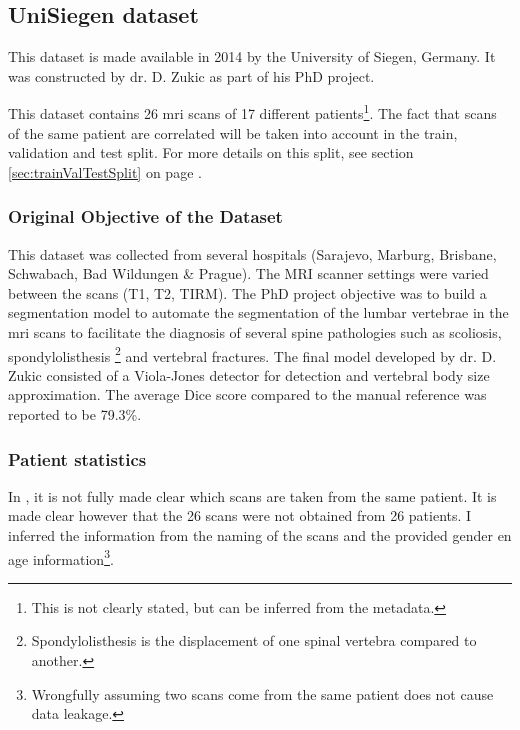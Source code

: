 
\subsection{UniSiegen dataset\label{sec:DataUSiegen}}

This dataset is made available in 2014 by the University of Siegen, Germany.
It was constructed by dr. D. Zukic \cite{Zukic2014} as part of his PhD project.


This dataset contains 26 \acrshort{mri} scans of 17 different patients\footnote{This is not clearly stated, but can be inferred from the metadata.}. 
The fact that scans of the same patient are correlated will be taken into account in the train, validation and test split.
For more details on this split, see section \ref{sec:trainValTestSplit} on page \pageref{sec:trainValTestSplit}.

\subsubsection{Original Objective of the Dataset}

This dataset was collected from several hospitals (Sarajevo, Marburg, Brisbane, Schwabach, Bad Wildungen \& Prague). The MRI scanner settings were varied between the scans (T1, T2, TIRM).
The PhD project objective was to build a segmentation model to automate the segmentation of the lumbar vertebrae in the \acrshort{mri} scans to facilitate the diagnosis of several spine pathologies 
such as scoliosis, spondylolisthesis \footnote{Spondylolisthesis is the displacement of one spinal vertebra compared to another.} and vertebral fractures.
The final model developed by dr. D. Zukic consisted of a Viola-Jones detector for detection and vertebral body size approximation.
The average Dice score compared to the manual reference was reported to be 79.3\%.

\subsubsection{Patient statistics}

In \cite{Zukic2014}, it is not fully made clear which scans are taken from the same patient.
It is made clear however that the 26 scans were not obtained from 26 patients.
I inferred the information from the naming of the scans and the provided gender en age information\footnote{
    Wrongfully assuming two scans come from the same patient does not cause data leakage.
}.

